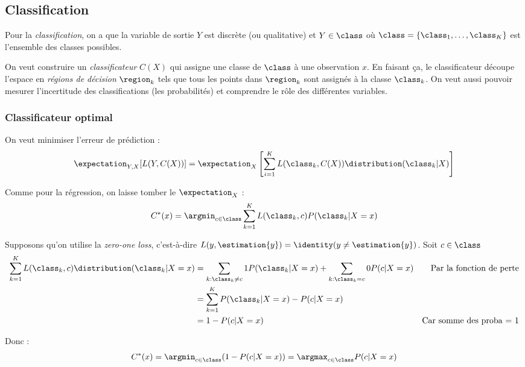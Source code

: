 \subsection{Classification}
    \begin{definition}
        Pour la \textit{classification}, on a que la variable de sortie \(Y\) est discrète (ou qualitative) et \(Y \in \class\) où \(\class = \{\class_1, \dots, \class_K\}\) est l'ensemble des classes possibles.

        On veut construire un \textit{classificateur} \(C(X)\) qui assigne une classe de \(\class\) à une observation \(x\). En faisant ça, le classificateur découpe l'espace en \textit{régions de décision} \(\region_k\) tels que tous les points dans \(\region_k\) sont assignés à la classe \(\class_k\). On veut aussi pouvoir mesurer l'incertitude des classifications (les probabilités) et comprendre le rôle des différentes variables.
    \end{definition}
    
    \subsubsection{Classificateur optimal}
        On veut minimiser l'erreur de prédiction :
        \[
            \expectation_{Y,X}[L(Y, C(X))] = \expectation_X\left[\sum_{i=1}^K L(\class_k, C(X))\distribution(\class_k|X)\right]
        \]

        Comme pour la régression, on laisse tomber le \(\expectation_X\) :
        \[
            C^*(x) = \argmin_{c \in \class} \sum_{k=1}^K L(\class_k, c)P(\class_k|X = x)
        \]

        Supposons qu'on utilise la \textit{zero-one loss}, c'est-à-dire \(L(y, \estimation{y}) = \identity(y \not= \estimation{y})\). Soit \(c \in \class\)
        \begin{align*}
            \sum_{k=1}^K L(\class_k, c)\distribution(\class_k|X = x) &= \sum_{k:\class_k \not= c} 1P(\class_k|X = x) + \sum_{k: \class_k=c} 0P(c | X = x) & \text{Par la fonction de perte}\\
            &= \sum_{k=1}^K P(\class_k | X = x) - P(c | X = x)\\
            &= 1 - P(c | X = x) & \text{Car somme des proba = 1}
        \end{align*}

        Donc :
        \[
            C^*(x) = \argmin_{c\in\class} (1 - P(c | X = x)) = \argmax_{c\in\class} P(c | X = x)
        \]

